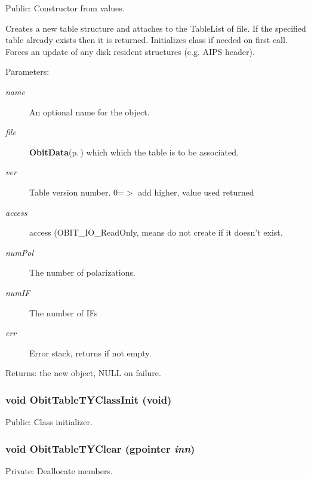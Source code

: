 Public: Constructor from values. 

Creates a new table structure and attaches to the Table\-List of file. If the specified table already exists then it is returned. Initializes class if needed on first call. Forces an update of any disk resident structures (e.g. AIPS header). \begin{Desc}
\item[Parameters:]
\begin{description}
\item[{\em name}]An optional name for the object. \item[{\em file}]{\bf Obit\-Data}{\rm (p.\,\pageref{structObitData})} which which the table is to be associated. \item[{\em ver}]Table version number. 0=$>$ add higher, value used returned \item[{\em access}]access (OBIT\_\-IO\_\-Read\-Only, means do not create if it doesn't exist. \item[{\em num\-Pol}]The number of polarizations. \item[{\em num\-IF}]The number of IFs \item[{\em err}]Error stack, returns if not empty. \end{description}
\end{Desc}
\begin{Desc}
\item[Returns:]the new object, NULL on failure. \end{Desc}
\subsubsection{\setlength{\rightskip}{0pt plus 5cm}void Obit\-Table\-TYClass\-Init (void)}\label{ObitTableTY_8c_a27}


Public: Class initializer. 

\subsubsection{\setlength{\rightskip}{0pt plus 5cm}void Obit\-Table\-TYClear (gpointer {\em inn})}\label{ObitTableTY_8c_a9}


Private: Deallocate members. 

